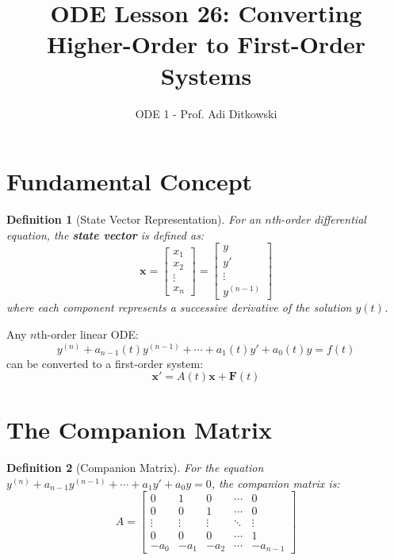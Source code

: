 \documentclass[12pt]{article}
\title{ODE Lesson 26: Converting Higher-Order to First-Order Systems}
\author{ODE 1 - Prof. Adi Ditkowski}
\date{}
\newtheorem{definition}{Definition}
\begin{document}
\maketitle

\section{Fundamental Concept}

\begin{definition}[State Vector Representation]
For an $n$th-order differential equation, the \textbf{state vector} is defined as:
$$\mathbf{x} = \begin{bmatrix} x_{1} \\ x_{2} \\ \vdots \\ x_{n} \end{bmatrix} = \begin{bmatrix} y \\ y' \\ \vdots \\ y^{(n-1)} \end{bmatrix}$$
where each component represents a successive derivative of the solution $y(t)$.
\end{definition}

\begin{keypoint}
Any $n$th-order linear ODE:
$$y^{(n)} + a_{n-1}(t)y^{(n-1)} + \cdots + a_{1}(t)y' + a_{0}(t)y = f(t)$$
can be converted to a first-order system:
$$\mathbf{x}' = A(t)\mathbf{x} + \mathbf{F}(t)$$
\end{keypoint}

\section{The Companion Matrix}

\begin{definition}[Companion Matrix]
For the equation $y^{(n)} + a_{n-1}y^{(n-1)} + \cdots + a_{1}y' + a_{0}y = 0$, the companion matrix is:
$$A = \begin{bmatrix}
0 & 1 & 0 & \cdots & 0 \\
0 & 0 & 1 & \cdots & 0 \\
\vdots & \vdots & \vdots & \ddots & \vdots \\
0 & 0 & 0 & \cdots & 1 \\
-a_{0} & -a_{1} & -a_{2} & \cdots & -a_{n-1}
\end{bmatrix}$$
\end{definition}
\end{document}
